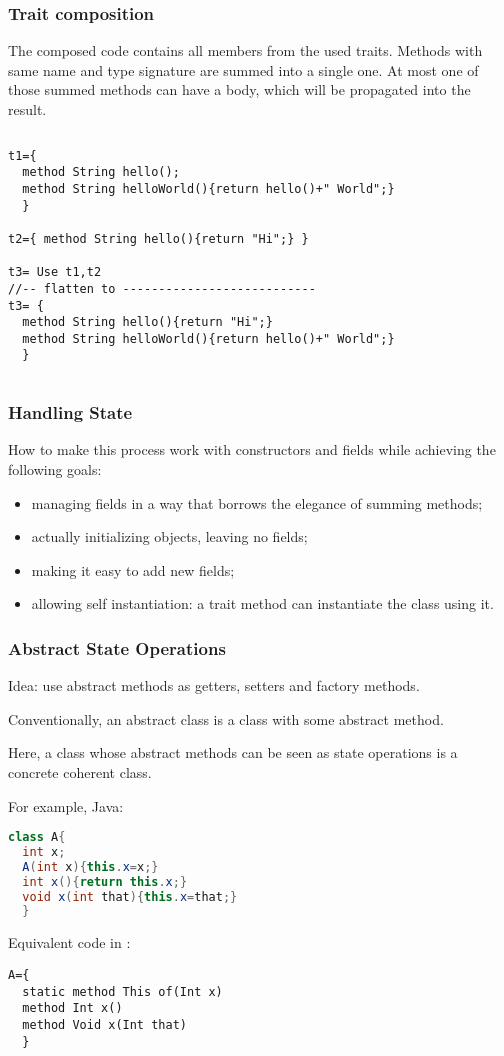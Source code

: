 \begin{frame}[fragile]
\frametitle{Trait composition}
The composed code contains all members from the used traits.
Methods with same name and type signature are summed into a single one.
At most one of those summed methods
can have a body, which will be propagated into the result.
\vspace{-1ex}
\begin{columns}
    \column{\dimexpr\paperwidth-10pt}
\begin{lstlisting}
t1={
  method String hello();
  method String helloWorld(){return hello()+" World";}
  }

t2={ method String hello(){return "Hi";} }

t3= Use t1,t2
//-- flatten to ---------------------------
t3= {
  method String hello(){return "Hi";}
  method String helloWorld(){return hello()+" World";}
  }
\end{lstlisting}
\end{columns}
\end{frame}

\begin{frame}[fragile]
\frametitle{Handling State}
How to make this process work with constructors and fields
while achieving the following goals:
\begin{itemize}
\item managing fields in a way that borrows the elegance of summing methods;
\item actually initializing objects, leaving no \Q@null@ fields;
\item making it easy to add new fields;
\item allowing self instantiation: a trait method can instantiate the class using it.
\end{itemize}

\end{frame}

\begin{frame}[fragile]
\frametitle{Abstract State Operations}
Idea: use abstract methods as getters, setters and factory methods.

Conventionally, an abstract class is a class with some abstract method.

Here, a class whose abstract methods can be seen as state operations is a
concrete coherent class.

For example, Java:
\vspace{-1ex}
\begin{lstlisting}[language=Java]
class A{
  int x;
  A(int x){this.x=x;}
  int x(){return this.x;}
  void x(int that){this.x=that;}
  }
\end{lstlisting}

Equivalent code in \name:
\vspace{-1ex}
\begin{lstlisting}
A={
  static method This of(Int x)
  method Int x()
  method Void x(Int that)
  }
\end{lstlisting}
\end{frame}

